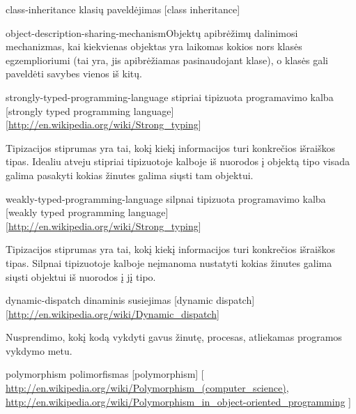 \begin{glossary}
  \begin{entry}%
    {class-inheritance}%
    {klasių paveldėjimas}%
    [class inheritance]

    \gls{object-description-sharing-mechanism}{Objektų apibrėžimų
    dalinimosi mechanizmas}, kai kiekvienas objektas yra laikomas
    kokios nors klasės egzemplioriumi (tai yra, jis apibrėžiamas
    pasinaudojant klase), o klasės gali paveldėti savybes vienos
    iš kitų.
    
  \end{entry}

  \begin{entry}%
    {strongly-typed-programming-language}%
    {stipriai tipizuota programavimo kalba}%
    [strongly typed programming language]%
    [\url{http://en.wikipedia.org/wiki/Strong_typing}]

    Tipizacijos stiprumas yra tai, kokį kiekį informacijos turi
    konkrečios išraiškos tipas. Idealiu atveju stipriai tipizuotoje
    kalboje iš nuorodos į objektą tipo visada galima pasakyti kokias
    žinutes galima siųsti tam
    objektui.\cite[1]{Madsen:1990:STO:97946.97964}
    
  \end{entry}

  \begin{entry}%
    {weakly-typed-programming-language}%
    {silpnai tipizuota programavimo kalba}%
    [weakly typed programming language]%
    [\url{http://en.wikipedia.org/wiki/Strong_typing}]

    Tipizacijos stiprumas yra tai, kokį kiekį informacijos turi
    konkrečios išraiškos tipas. Silpnai tipizuotoje kalboje neįmanoma
    nustatyti kokias žinutes galima siųsti objektui iš nuorodos į jį
    tipo.\cite[1]{Madsen:1990:STO:97946.97964}
    
  \end{entry}


  \begin{entry}%
    {dynamic-dispatch}%
    {dinaminis susiejimas}%
    [dynamic dispatch]%
    [\url{http://en.wikipedia.org/wiki/Dynamic_dispatch}]

    Nusprendimo, kokį kodą vykdyti gavus žinutę, procesas,
    atliekamas programos vykdymo metu.

  \end{entry}

  \begin{entry}%
    {polymorphism}%
    {polimorfismas}%
    [polymorphism]%
    [%
    \url{http://en.wikipedia.org/wiki/Polymorphism_(computer_science)}, %
    \url{http://en.wikipedia.org/wiki/Polymorphism_in_object-oriented_programming}%
    ]%


\end{entry}
\end{glossary}
